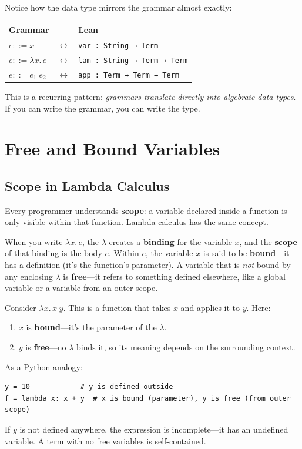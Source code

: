 \documentclass[11pt,a4paper]{article}
\theoremstyle{definition}
\newcommand{\lam}{\lambda}
\begin{document}
Notice how the data type mirrors the grammar almost exactly:
\begin{center}
\renewcommand{\arraystretch}{1.4}
\begin{tabular}{lcl}
\textbf{Grammar} & & \textbf{Lean} \\
\hline
$e ::= x$          & $\longleftrightarrow$ & \texttt{var : String → Term} \\
$e ::= \lam x.\, e$ & $\longleftrightarrow$ & \texttt{lam : String → Term → Term} \\
$e ::= e_1\; e_2$    & $\longleftrightarrow$ & \texttt{app : Term → Term → Term} \\
\end{tabular}
\end{center}

This is a recurring pattern: \emph{grammars translate directly into algebraic
data types}. If you can write the grammar, you can write the type.

\section{Free and Bound Variables}\label{sec:fv}

\subsection{Scope in Lambda Calculus}

Every programmer understands \textbf{scope}: a variable declared inside a
function is only visible within that function. Lambda calculus has the same
concept.

When you write $\lam x.\, e$, the $\lam$ creates a \textbf{binding} for the
variable $x$, and the \textbf{scope} of that binding is the body $e$. Within
$e$, the variable $x$ is said to be \textbf{bound}---it has a definition
(it's the function's parameter). A variable that is \emph{not} bound by any
enclosing $\lam$ is \textbf{free}---it refers to something defined elsewhere,
like a global variable or a variable from an outer scope.

\begin{workedexample}
Consider $\lam x.\, x\; y$. This is a function that takes $x$ and applies it
to $y$. Here:
\begin{enumerate}[leftmargin=2em]
\item $x$ is \textbf{bound}---it's the parameter of the $\lam$.
\item $y$ is \textbf{free}---no $\lam$ binds it, so its meaning depends on
  the surrounding context.
\end{enumerate}
As a Python analogy:
\begin{verbatim}
y = 10            # y is defined outside
f = lambda x: x + y  # x is bound (parameter), y is free (from outer scope)
\end{verbatim}
If $y$ is not defined anywhere, the expression is incomplete---it has an
undefined variable. A term with no free variables is self-contained.
\end{workedexample}
\end{document}
